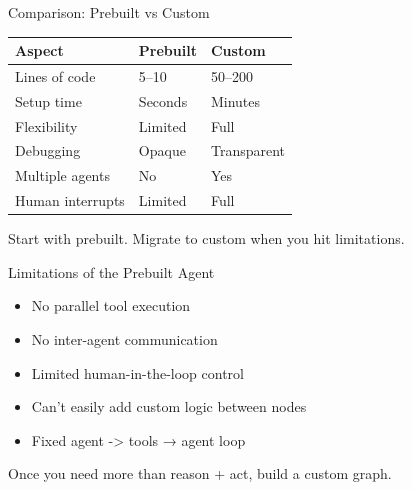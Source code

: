 \documentclass[aspectratio=169,11pt]{beamer}
\begin{document}
\begin{frame}[fragile]{Comparison: Prebuilt vs Custom}
  \begin{center}
    \footnotesize
    \begin{tabular}{|l|l|l|}
      \hline
      \textbf{Aspect} & \textbf{Prebuilt} & \textbf{Custom} \\
      \hline
      Lines of code & 5--10 & 50--200 \\
      \hline
      Setup time & Seconds & Minutes \\
      \hline
      Flexibility & Limited & Full \\
      \hline
      Debugging & Opaque & Transparent \\
      \hline
      Multiple agents & No & Yes \\
      \hline
      Human interrupts & Limited & Full \\
      \hline
    \end{tabular}
  \end{center}
  \vspace{0.15cm}
  \begin{tipbox}[Strategy]
    Start with prebuilt. Migrate to custom when you hit limitations.
  \end{tipbox}
\end{frame}

\begin{frame}{Limitations of the Prebuilt Agent}
  \begin{warningbox}
    \setlength{\itemsep}{1pt}
    \begin{itemize}
      \item No parallel tool execution
      \item No inter-agent communication
      \item Limited human-in-the-loop control
      \item Can't easily add custom logic between nodes
      \item Fixed agent -> tools → agent loop
    \end{itemize}
  \end{warningbox}
  \vspace{0.1cm}
  \begin{tipbox}
    Once you need more than reason + act, build a custom graph.
  \end{tipbox}
\end{frame}
\end{document}
